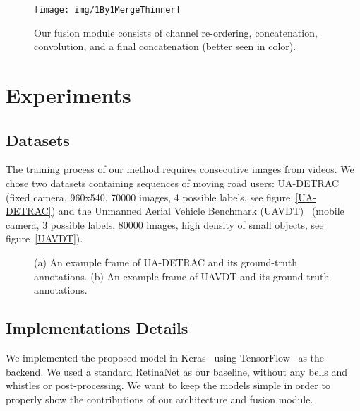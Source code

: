 \documentclass[runningheads]{llncs}
\begin{document}
\begin{figure}[t]
\begin{center}
\texttt{[image: img/1By1MergeThinner]}
\vspace{-1em}
\end{center}
   \caption{Our fusion module consists of channel re-ordering, concatenation,  convolution, and a final concatenation (better seen in color).}
\label{fusion}
\end{figure}

\section{Experiments}

\subsection{Datasets}

The training process of our method requires consecutive images from videos. We chose two datasets containing sequences of moving road users: UA-DETRAC~\cite{Wen2015Tracking} (fixed camera, 960x540, 70000 images, 4 possible labels, see figure~\ref{UA-DETRAC}) and the Unmanned Aerial Vehicle Benchmark (UAVDT)~\cite{du2018unmanned} (mobile camera, 3 possible labels, 80000 images, high density of small objects, see figure~\ref{UAVDT}).


\begin{figure}[t]\centering
    \hspace{3.5em}
    \vspace{-0.5em}
    \caption{(a) An example frame of UA-DETRAC and its ground-truth annotations. (b) An example frame of UAVDT and its ground-truth annotations.}
\end{figure}

\subsection{Implementations Details}

We implemented the proposed model in Keras~\cite{chollet2015keras} using TensorFlow~\cite{tensorflow2015-whitepaper} as the backend. We used a standard RetinaNet as our baseline, without any bells and whistles or post-processing. We want to keep the models simple in order to properly show the contributions of our architecture and fusion module.
\end{document}
